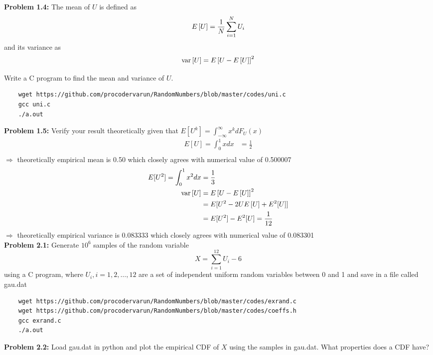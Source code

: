\documentclass[journal,12pt,twocolumn]{IEEEtran}
\begin{document}
\textbf{Problem 1.4: }The mean of $U$ is defined as
%
\begin{equation}
E{}\left[U\right] = \frac{1}{N}\sum_{i=1}^{N}U_i
\end{equation}
%
and its variance as
%
\begin{equation}
\text{var}{}\left[U\right] = E{}\left[U- E{}\left[U\right]\right]^2 
\end{equation}

Write a C program to  find the mean and variance of $U$.\\
\solution
\begin{lstlisting}
    wget https://github.com/procodervarun/RandomNumbers/blob/master/codes/uni.c
    gcc uni.c
    ./a.out
\end{lstlisting}
\textbf{Problem 1.5:} Verify your result theoretically given that $E[U^k] = \int_{-\infty}^{\infty}x^k dF_U(x)$\\
\solution
\begin{align}
    E[U] = \int_{0}^{1}xdx &= \frac{1}{2}\\
\end{align}
$\Rightarrow$ theoretically empirical mean is 0.50 which closely agrees with numerical value of 0.500007\\
\begin{align}
    E[U^2] = \int_{0}^{1}x^2dx &= \frac{1}{3}\\
    \text{var}{}\left[U\right] &= E{}\left[U-E{}\left[U\right]\right]^2\\
    &= E[U^2-2UE{}\left[U\right]+E^2[U]]\\ 
    &= E[U^2]-E^2[U] = \frac{1}{12}
\end{align}
$\Rightarrow$ theoretically empirical variance is 0.083333 which closely agrees with numerical value of 0.083301\\
\textbf{Problem 2.1: }Generate $10^6$ samples of the random variable
\begin{equation}
X = \sum_{i=1}^{12}U_i -6
\end{equation}
using a C program, where $U_i, i = 1,2,\dots, 12$ are  a set of independent uniform random variables between 0 and 1 and save in a file called gau.dat\\
\solution
\begin{lstlisting}
    wget https://github.com/procodervarun/RandomNumbers/blob/master/codes/exrand.c
    wget https://github.com/procodervarun/RandomNumbers/blob/master/codes/coeffs.h
    gcc exrand.c
    ./a.out
\end{lstlisting}
\textbf{Problem 2.2: }Load gau.dat in python and plot the empirical CDF of $X$ using the samples in gau.dat. What properties does a CDF have?\\
\end{document}
